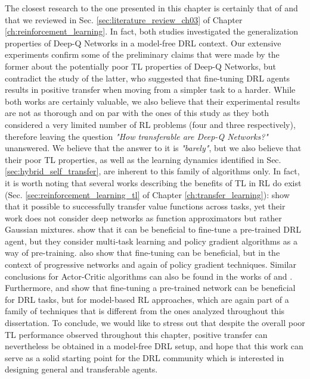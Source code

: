 The closest research to the one presented in this chapter is certainly that of \citet{farebrother2018generalization} and \citet{tyo2020transferable} that we reviewed in Sec. \ref{sec:literature_review_ch03} of Chapter \ref{ch:reinforcement_learning}. In fact, both studies investigated the generalization properties of Deep-Q Networks in a model-free DRL context. Our extensive experiments confirm some of the preliminary claims that were made by the former about the potentially poor TL properties of Deep-Q Networks, but contradict the study of the latter, who suggested that fine-tuning DRL agents results in positive transfer when moving from a simpler task to a harder. While both works are certainly valuable, we also believe that their experimental results are not as thorough and on par with the ones of this study as they both considered a very limited number of RL problems (four and three respectively), therefore leaving the question \textit{"How transferable are Deep-Q Networks?"} unanswered. We believe that the answer to it is \textit{"barely"}, but we also believe that their poor TL properties, as well as the learning dynamics identified in Sec. \ref{sec:hybrid_self_transfer}, are inherent to this family of algorithms only. In fact, it is worth noting that several works describing the benefits of TL in RL do exist (Sec. \ref{sec:reinforcement_learning_tl} of Chapter \ref{ch:transfer_learning}): \citet{tirinzoni2018transfer} show that it possible to successfully transfer value functions across tasks, yet their work does not consider deep networks as function approximators but rather Gaussian mixtures. \citet{parisotto2015actor} show that it can be beneficial to fine-tune a pre-trained DRL agent, but they consider multi-task learning and policy gradient algorithms as a way of pre-training. \citet{rusu2016progressive} also show that fine-tuning can be beneficial, but in the context of progressive networks and again of policy gradient techniques. Similar conclusions for Actor-Critic algorithms can also be found in the works of \citet{zhu2017target} and \citet{chen2021improving}. Furthermore, \citet{landolfi2019model} and \citet{sasso2021fractional} show that fine-tuning a pre-trained network can be beneficial for DRL tasks, but for model-based RL approaches, which are again part of a family of techniques that is different from the ones analyzed throughout this dissertation. To conclude, we would like to stress out that despite the overall poor TL performance observed throughout this chapter, positive transfer can nevertheless be obtained in a model-free DRL setup, and hope that this work can serve as a solid starting point for the DRL community which is interested in designing general and transferable agents.  








